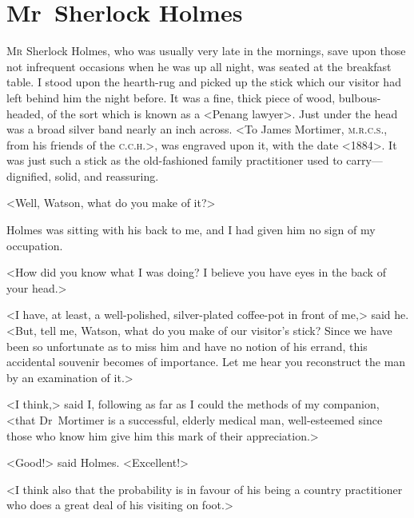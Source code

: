 


\chapter{Mr~Sherlock Holmes}
\lettrine{M}{r} Sherlock Holmes, who was usually very late in the mornings, save upon those not infrequent occasions when he was up all night, was seated at the breakfast table. I stood upon the hearth-rug and picked up the stick which our visitor had left behind him the night before. It was a fine, thick piece of wood, bulbous-headed, of the sort which is known as a <Penang lawyer>. Just under the head was a broad silver band nearly an inch across. <To James Mortimer, \textsc{m.r.c.s.}, from his friends of the \textsc{c.c.h.}>, was engraved upon it, with the date <1884>. It was just such a stick as the old-fashioned family practitioner used to carry—dignified, solid, and reassuring.

<Well, Watson, what do you make of it?>

Holmes was sitting with his back to me, and I had given him no sign of my occupation.

<How did you know what I was doing? I believe you have eyes in the back of your head.>

<I have, at least, a well-polished, silver-plated coffee-pot in front of me,> said he. <But, tell me, Watson, what do you make of our visitor's stick? Since we have been so unfortunate as to miss him and have no notion of his errand, this accidental souvenir becomes of importance. Let me hear you reconstruct the man by an examination of it.>

<I think,> said I, following as far as I could the methods of my companion, <that Dr~Mortimer is a successful, elderly medical man, well-esteemed since those who know him give him this mark of their appreciation.>

<Good!> said Holmes. <Excellent!>

<I think also that the probability is in favour of his being a country practitioner who does a great deal of his visiting on foot.>



